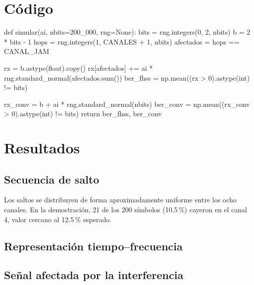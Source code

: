 \documentclass[11pt,a4paper]{article}
\begin{document}
\section{Código}

\begin{codigo}
def simular(ai, nbits=200_000, rng=None):
    bits = rng.integers(0, 2, nbits)
    b = 2 * bits - 1
    hops = rng.integers(1, CANALES + 1, nbits)
    afectados = hops == CANAL_JAM

    rx = b.astype(float).copy()
    rx[afectados] += ai * rng.standard_normal(afectados.sum())
    ber_fhss = np.mean((rx > 0).astype(int) != bits)

    rx_conv = b + ai * rng.standard_normal(nbits)
    ber_conv = np.mean((rx_conv > 0).astype(int) != bits)
    return ber_fhss, ber_conv
\end{codigo}

\section{Resultados}

\subsection{Secuencia de salto}


Los saltos se distribuyen de forma aproximadamente uniforme entre los ocho canales. En la
demostración, 21 de los 200 símbolos (10.5\,\%) cayeron en el canal 4, valor cercano al
12.5\,\% esperado.

\subsection{Representación tiempo--frecuencia}


\subsection{Señal afectada por la interferencia}

\end{document}
